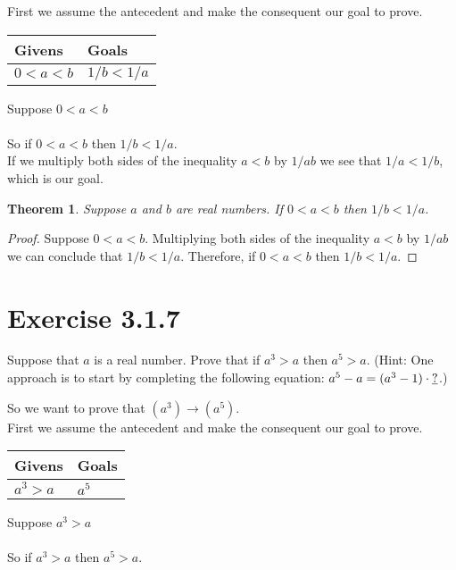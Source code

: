 \documentclass{article}
\newcommand{\n}{ \noindent }
\newtheorem*{theorem}{Theorem}  %
\begin{document}
\n First we assume the antecedent and make the consequent our goal to prove.

\begin{table}[h]
\begin{tabular}{ll}
\hline
Givens & Goals   \\ \hline
$0<a<b$ & $1/b < 1/a$   \\ \hline
\end{tabular}
\end{table}

\n Suppose $0<a<b$ \\
\indent [proof of $1/b < 1/a$] \\
\n So if $0<a<b$ then $1/b < 1/a$. \\

\n If we multiply both sides of the inequality $a<b$ by $1/ab$ we see that $1/a < 1/b$, which is our goal.

\begin{theorem} Suppose $a$ and $b$ are real numbers. If $0<a<b$ then $1/b < 1/a$.
\end{theorem}
\begin{proof}
Suppose $0<a<b$. Multiplying both sides of the inequality $a<b$ by $1/ab$ we can conclude that $1/b < 1/a$. Therefore, if $0<a<b$ then $1/b < 1/a$.
\end{proof}

\section*{Exercise 3.1.7}
Suppose that $a$ is a real number. Prove that if $a^3 > a$ then $a^5 > a$. (Hint: One approach is to start by completing the following equation: $a^5 - a = (a^3 - 1) \cdot \text{\underline{?}}$.)

\n So we want to prove that
$(a^3) \rightarrow (a^5)$. \\

\n First we assume the antecedent and make the consequent our goal to prove.

\begin{table}[h]
\begin{tabular}{ll}
\hline
Givens & Goals   \\ \hline
$a^3 > a$ & $a^5$   \\ \hline
\end{tabular}
\end{table}

\n Suppose $a^3 > a$ \\
\indent [proof of $a^5 > a$] \\
\n So if $a^3 > a$ then $a^5 > a$. \\
\end{document}
